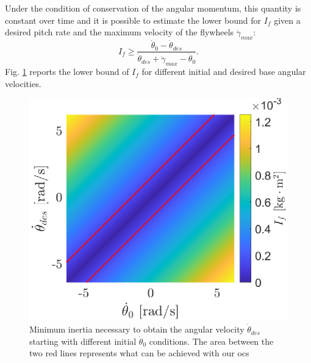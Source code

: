 \documentclass[letterpaper, 10 pt, conference]{ieeeconf}  %
\begin{document}
Under the condition of conservation of the angular momentum, this quantity is constant over time and it is possible to estimate the lower bound for $I_{f}$ given a desired pitch rate and the maximum velocity of the flywheels $\dot{\gamma}_{max}$:
\begin{equation}
I_{f} \geq \dfrac{\dot{\theta}_0-\dot{\theta}_{des}}{\dot{\theta}_{des}+\dot{\gamma}_{max}-\dot{\theta}_0}.
\end{equation}
Fig. \ref{fig:inertia_limits} reports the lower bound of $I_{f}$ for different initial and desired base angular velocities.
\begin{figure}
	\centering
	\includegraphics[width=.7\linewidth]{figures/inertia_limits.eps}
	\caption{\small Minimum inertia necessary to obtain the angular velocity $\dot{\theta}_{des}$ starting with different initial $\dot{\theta}_0$ conditions. The area between the two red lines represents what can be achieved with our \gls{ocs}}
	\label{fig:inertia_limits}
\end{figure}
\end{document}
